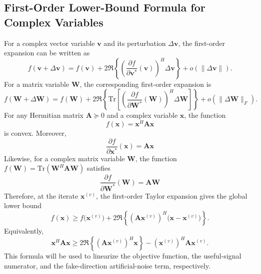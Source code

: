 \documentclass[conference,twocolumn,a4paper]{IEEEtran}
\begin{document}
\subsection{First-Order Lower-Bound Formula for Complex Variables}
For a complex vector variable $\mathbf{v}$ and its perturbation $\Delta\mathbf{v}$, the first-order expansion can be written as
\begin{equation}
f(\mathbf{v}+\Delta\mathbf{v})
=
f(\mathbf{v})
+2\Re\!\left\{\left(\frac{\partial f}{\partial \mathbf{v}^*}(\mathbf{v})\right)^H\Delta\mathbf{v}\right\}
+o(\|\Delta\mathbf{v}\|).
\label{eq:appB-complex-taylor-en}
\end{equation}
For a matrix variable $\mathbf{W}$, the corresponding first-order expansion is
\begin{equation}
f(\mathbf{W}+\Delta\mathbf{W})
=
f(\mathbf{W})
+2\Re\!\left\{\mathrm{Tr}\!\left[\left(\frac{\partial f}{\partial \mathbf{W}^*}(\mathbf{W})\right)^H\Delta\mathbf{W}\right]\right\}
+o(\|\Delta\mathbf{W}\|_F).
\label{eq:appB-matrix-taylor-en}
\end{equation}
For any Hermitian matrix $\mathbf{A}\succeq 0$ and a complex variable $\mathbf{x}$, the function
\begin{equation}
f(\mathbf{x})=\mathbf{x}^H\mathbf{A}\mathbf{x}
\end{equation}
is convex. Moreover,
\begin{equation}
\frac{\partial f}{\partial \mathbf{x}^*}(\mathbf{x}) = \mathbf{A}\mathbf{x}
\end{equation}
Likewise, for a complex matrix variable $\mathbf{W}$, the function $f(\mathbf{W})=\mathrm{Tr}(\mathbf{W}^H\mathbf{A}\mathbf{W})$ satisfies
\begin{equation}
\frac{\partial f}{\partial \mathbf{W}^*}(\mathbf{W}) = \mathbf{A}\mathbf{W}
\end{equation}
Therefore, at the iterate $\mathbf{x}^{(v)}$, the first-order Taylor expansion gives the global lower bound
\begin{equation}
f(\mathbf{x})\ge f\big(\mathbf{x}^{(v)}\big)+2\Re\!\left\{\left(\mathbf{A}\mathbf{x}^{(v)}\right)^H\big(\mathbf{x}-\mathbf{x}^{(v)}\big)\right\}.
\label{eq:appB-taylor-en}
\end{equation}
Equivalently,
\begin{equation}
\mathbf{x}^H\mathbf{A}\mathbf{x}\ge 2\Re\!\left\{\left(\mathbf{A}\mathbf{x}^{(v)}\right)^H\mathbf{x}\right\}-\left(\mathbf{x}^{(v)}\right)^H\mathbf{A}\mathbf{x}^{(v)}.
\label{eq:appB-basiclb-en}
\end{equation}
This formula will be used to linearize the objective function, the useful-signal numerator, and the fake-direction artificial-noise term, respectively.
\end{document}

